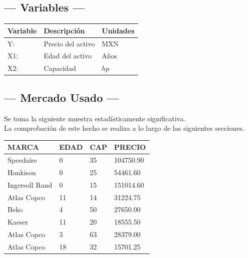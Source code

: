 \subsection{\centering --- Variables ---} %
\begin{center}
  \begin{tabular}{|l|l|l|}
    \hline 
    Variable & Descripción   & Unidades\\ \hline 
    Y:  & Precio del activo  & MXN \\ \hline 
    X1: & Edad del activo    & Años \\ \hline 
		X2: & Capacidad & \(hp\) \\ \hline 
  \end{tabular}
\end{center} 

\subsection{\centering --- Mercado Usado ---} %
Se toma la siguiente muestra estadísticamente significativa. \\ 
La comprobación de este hecho se realiza a lo largo de las siguientes secciones.
\begin{center}
	\begin{tabular}{*{4}{|p{3cm}}|}
		\hline 
MARCA          & EDAD  & CAP  & PRECIO\\ \hline
Speedaire      & 0     & 35   & 104750.90\\ \hline
Hankison       & 0     & 25   & 54461.60\\ \hline
Ingersoll Rand & 0     & 15   & 151014.60\\ \hline
Atlas Copco    & 11    & 14   & 31224.75\\ \hline
Beko           & 4     & 50   & 27650.00\\ \hline
Kaeser         & 11    & 20   & 18555.50\\ \hline
Atlas Copco    & 3     & 63   & 28379.00\\ \hline
Atlas Copco    & 18    & 32   & 15701.25\\ \hline
	\end{tabular}
\end{center}

